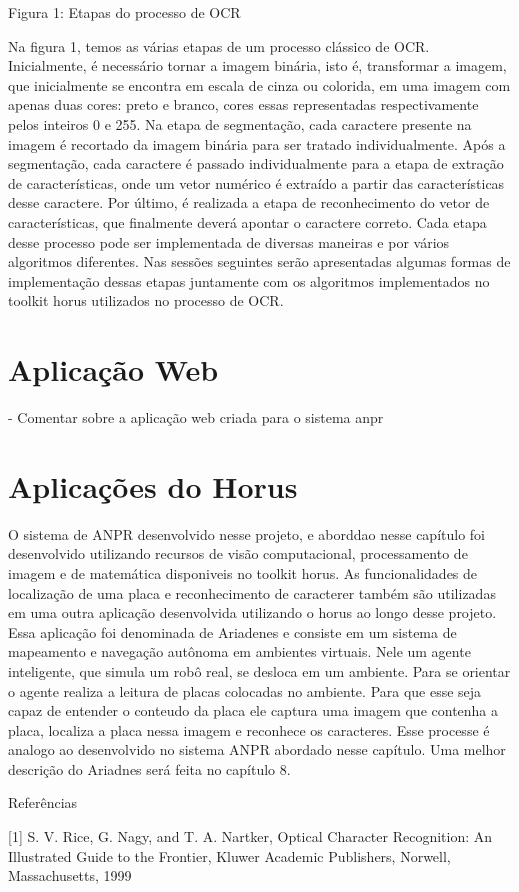     {Figura 1: Etapas do processo de OCR}
    
    Na figura 1, temos as várias etapas de um processo clássico de OCR. Inicialmente, é necessário tornar a imagem binária, isto é, transformar a imagem, que inicialmente se encontra em escala de cinza ou colorida, em uma imagem com apenas duas cores: preto e branco, cores essas representadas respectivamente pelos inteiros 0 e 255. Na etapa de segmentação, cada caractere presente na imagem é recortado da imagem binária para ser tratado individualmente. Após a segmentação, cada caractere é passado individualmente para a etapa de extração de características, onde um vetor numérico é extraído a partir das características desse caractere. Por último, é realizada a etapa de reconhecimento do vetor de características, que finalmente deverá apontar o caractere correto. Cada etapa desse processo pode ser implementada de diversas maneiras e por vários algoritmos diferentes. Nas sessões seguintes serão apresentadas algumas formas de implementação dessas etapas juntamente com os algoritmos implementados no toolkit horus utilizados no processo de OCR.

    \section{Aplicação Web}
    - Comentar sobre a aplicação web criada para o sistema anpr
    
    \section{Aplicações do Horus}
    O sistema de ANPR desenvolvido nesse projeto, e aborddao nesse capítulo foi desenvolvido utilizando recursos de visão computacional, processamento de imagem e de matemática disponiveis no toolkit horus. As funcionalidades de localização de uma placa e reconhecimento de caracterer também são utilizadas em uma outra aplicação desenvolvida utilizando o horus ao longo desse projeto. Essa aplicação foi denominada de Ariadenes e consiste em um sistema de mapeamento e navegação autônoma em ambientes virtuais. Nele um agente inteligente, que simula um robô real, se desloca em um ambiente. Para se orientar o agente realiza a leitura de placas colocadas no ambiente. Para que esse seja capaz de entender o conteudo da placa ele captura uma imagem que contenha a placa, localiza a placa nessa imagem e reconhece os caracteres. Esse processe é analogo ao desenvolvido no sistema ANPR abordado nesse capítulo. Uma melhor descrição do Ariadnes será feita no capítulo 8.

Referências

[1] S. V. Rice, G. Nagy, and T. A. Nartker, Optical Character Recognition: An Illustrated Guide to the Frontier, Kluwer Academic Publishers, Norwell, Massachusetts, 1999
